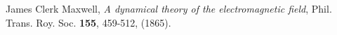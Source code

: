 \documentclass[10pt, twocolumn, twoside]{article}
\begin{document}
\lipsum[1-4]

\begin{thebibliography}{1}

 James Clerk Maxwell, \emph{A dynamical theory of the electromagnetic field},  Phil. Trans. Roy. Soc. {\bf 155}, 459-512, (1865).%

\end{thebibliography}
\end{document}
